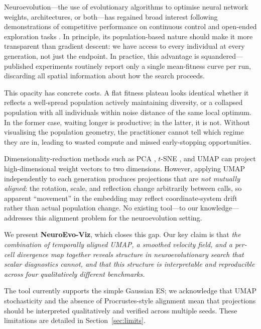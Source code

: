 \documentclass{article}
\begin{document}
Neuroevolution---the use of evolutionary algorithms to optimise neural network
weights, architectures, or both---has regained broad interest following
demonstrations of competitive performance on continuous control
\citep{salimans2017evolution,such2017deep} and open-ended exploration tasks
\citep{stanley2019designing}.
In principle, its population-based nature should make it more transparent than
gradient descent: we have access to every individual at every generation,
not just the endpoint.
In practice, this advantage is squandered---published experiments routinely
report only a single mean-fitness curve per run, discarding all spatial
information about how the search proceeds.

This opacity has concrete costs.
A flat fitness plateau looks identical whether it reflects a well-spread
population actively maintaining diversity, or a collapsed population with all
individuals within noise distance of the same local optimum.
In the former case, waiting longer is productive; in the latter, it is
not.
Without visualising the population geometry, the practitioner cannot tell
which regime they are in, leading to wasted compute and missed early-stopping
opportunities.

Dimensionality-reduction methods such as
PCA \citep{pearson1901pca},
$t$-SNE \citep{vandermaaten2008tsne}, and UMAP \citep{mcinnes2018umap}
can project high-dimensional weight vectors to two dimensions.
However, applying UMAP independently to each generation produces projections
that are \emph{not mutually aligned}: the rotation, scale, and reflection
change arbitrarily between calls, so apparent ``movement'' in the embedding
may reflect coordinate-system drift rather than actual population change.
No existing tool---to our knowledge---addresses this alignment problem for
the neuroevolution setting.

We present \textbf{NeuroEvo-Viz}, which closes this gap.
Our key claim is that \emph{the combination of temporally aligned UMAP,
a smoothed velocity field, and a per-cell divergence map together reveals
structure in neuroevolutionary search that scalar diagnostics cannot, and that
this structure is interpretable and reproducible across four qualitatively
different benchmarks.}

The tool currently supports the simple Gaussian ES;
we acknowledge that UMAP stochasticity and the absence of Procrustes-style
alignment mean that projections should be interpreted qualitatively and
verified across multiple seeds.
These limitations are detailed in Section~\ref{sec:limits}.
\end{document}

